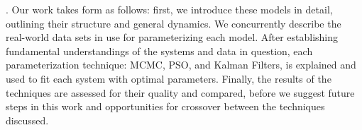 \documentclass{article}
\begin{document}
\par. Our work takes form as follows: first, we introduce these models in detail, outlining their structure and general dynamics. We concurrently describe the real-world data sets in use for parameterizing each model. After establishing fundamental understandings of the systems and data in question, each parameterization technique: MCMC, PSO, and Kalman Filters, is explained and used to fit each system with optimal parameters. Finally, the results of the techniques are assessed for their quality and compared, before we suggest future steps in this work and opportunities for crossover between the techniques discussed. 
\end{document}
